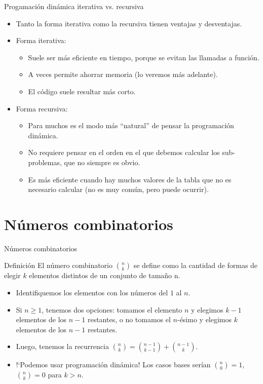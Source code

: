 \documentclass{beamer}
\begin{document}
\begin{frame}{Progamaci\'on din\'amica iterativa vs. recursiva}
\begin{itemize}
\item
Tanto la forma iterativa como la recursiva tienen ventajas y desventajas.
\item
Forma iterativa:
\begin{itemize}
\item
Suele ser m\'as eficiente en tiempo, porque se evitan las llamadas a funci\'on.
\item
A veces permite ahorrar memoria (lo veremos m\'as adelante).
\item
El c\'odigo suele resultar m\'as corto.
\end{itemize}
\item
Forma recursiva:
\begin{itemize}
\item
Para muchos es el modo m\'as ``natural'' de pensar la programaci\'on din\'amica.
\item
No requiere pensar en el orden en el que debemos calcular los sub-problemas, que no siempre es obvio.
\item
Es m\'as eficiente cuando hay muchos valores de la tabla que no es necesario calcular (no es muy com\'un, pero puede ocurrir).
\end{itemize}
\end{itemize}
\end{frame}

\section{N\'umeros combinatorios}

\begin{frame}{N\'umeros combinatorios}
\begin{block}{Definici\'on}
El n\'umero combinatorio $\binom{n}{k}$ se define como la cantidad de formas de elegir $k$ elementos distintos de un conjunto de tama\~no n.
\end{block}
\begin{itemize}
\item
Identifiquemos los elementos con los n\'umeros del $1$ al $n$.
\item
Si $n \ge 1$, tenemos dos opciones: tomamos el elemento $n$ y elegimos $k-1$ elementos de los $n-1$ restantes, o no tomamos el $n$-\'esimo y elegimos $k$ elementos de los $n-1$ restantes.
\item
Luego, tenemos la recurrencia $\binom{n}{k} = \binom{n-1}{k-1} + \binom{n-1}{k}$.
\item
!`Podemos usar programaci\'on din\'amica! Los casos bases ser\'ian $\binom{n}{0} = 1$, $\binom{n}{k} = 0$ para $k > n$.
\end{itemize}
\end{frame}
\end{document}
